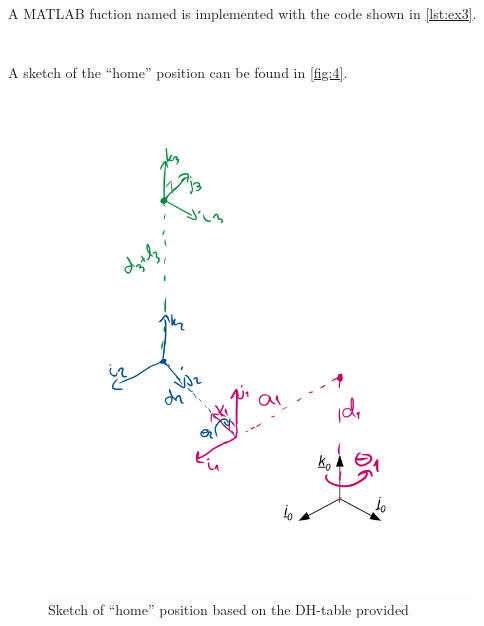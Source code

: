 \documentclass[a4paper]{scrartcl}
\begin{document}
\section{}
A MATLAB fuction named  is implemented with the code shown in \autoref{lst:ex3}.


\section{}
A sketch of the ``home'' position can be found in \autoref{fig:4}.

\begin{figure}[h!]
    \centering
    \includegraphics[width = .95\textwidth]{4.PNG}
    \caption{Sketch of ``home'' position based on the DH-table provided}
    \label{fig:4}
\end{figure}

\section{}
\end{document}
